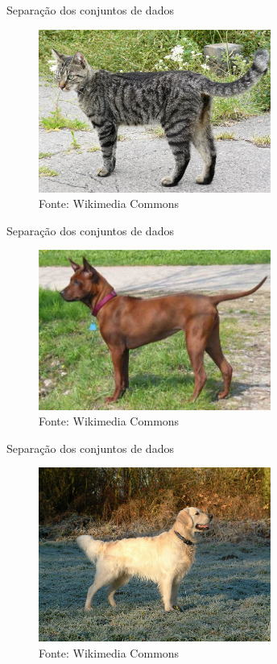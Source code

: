 \documentclass{beamer}
\begin{document}
    \begin{frame}{Separação dos conjuntos de dados}
      \begin{figure}[htpb]
	\includegraphics[width=3in]{dog3.jpg}
	\caption{Fonte: Wikimedia Commons}
      \end{figure}
    \end{frame}
    
    \begin{frame}{Separação dos conjuntos de dados}
      \begin{figure}[htpb]
	\includegraphics[width=3in]{dog2.jpg}
	\caption{Fonte: Wikimedia Commons}
      \end{figure}
    \end{frame}
    
    \begin{frame}{Separação dos conjuntos de dados}
      \begin{figure}[htpb]
	\includegraphics[width=3in]{dog4.jpg}
	\caption{Fonte: Wikimedia Commons}
      \end{figure}
    \end{frame}
    
\end{document}
